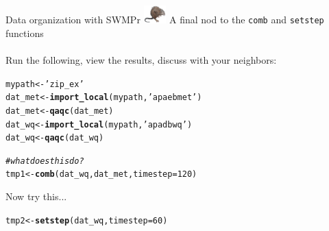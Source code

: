\documentclass[xcolor=dvipsnames]{beamer}\usepackage[]{graphicx}\usepackage[]{color}
\makeatletter
\newcommand{\hlnum}[1]{\textcolor[rgb]{0.686,0.059,0.569}{#1}}%
\newcommand{\hlstr}[1]{\textcolor[rgb]{0.192,0.494,0.8}{#1}}%
\newcommand{\hlcom}[1]{\textcolor[rgb]{0.678,0.584,0.686}{\textit{#1}}}%
\newcommand{\hlstd}[1]{\textcolor[rgb]{0.345,0.345,0.345}{#1}}%
\newcommand{\hlkwb}[1]{\textcolor[rgb]{0.69,0.353,0.396}{#1}}%
\newcommand{\hlkwc}[1]{\textcolor[rgb]{0.333,0.667,0.333}{#1}}%
\newcommand{\hlkwd}[1]{\textcolor[rgb]{0.737,0.353,0.396}{\textbf{#1}}}%
\newenvironment{kframe}{%
 \def\at@end@of@kframe{}%
 \ifinner\ifhmode%
  \def\at@end@of@kframe{\end{minipage}}%
  \begin{minipage}{\columnwidth}%
 \fi\fi%
 \def\FrameCommand##1{\hskip\@totalleftmargin \hskip-\fboxsep
 \colorbox{shadecolor}{##1}\hskip-\fboxsep
     \hskip-\linewidth \hskip-\@totalleftmargin \hskip\columnwidth}%
 \MakeFramed {\advance\hsize-\width
   \@totalleftmargin\z@ \linewidth\hsize
   \@setminipage}}%
 {\par\unskip\endMakeFramed%
 \at@end@of@kframe}
\newenvironment{knitrout}{}{} %
\makeatother
\begin{document}
\begin{frame}[fragile]{Data organization with SWMPr \includegraphics[width = 0.065\textwidth]{imgs/swmprat.png}}
\onslide<+->
A final nod to the \texttt{comb} and \texttt{setstep} functions \\~\\
Run the following, view the results, discuss with your neighbors:
\begin{knitrout}\scriptsize
{}\color{fgcolor}\begin{kframe}
\begin{alltt}
\hlstd{mypath} \hlkwb{<-} \hlstr{'zip_ex'}
\hlstd{dat_met} \hlkwb{<-} \hlkwd{import_local}\hlstd{(mypath,} \hlstr{'apaebmet'}\hlstd{)}
\hlstd{dat_met} \hlkwb{<-} \hlkwd{qaqc}\hlstd{(dat_met)}
\hlstd{dat_wq} \hlkwb{<-} \hlkwd{import_local}\hlstd{(mypath,} \hlstr{'apadbwq'}\hlstd{)}
\hlstd{dat_wq} \hlkwb{<-} \hlkwd{qaqc}\hlstd{(dat_wq)}

\hlcom{# what does this do?}
\hlstd{tmp1} \hlkwb{<-} \hlkwd{comb}\hlstd{(dat_wq, dat_met,} \hlkwc{timestep} \hlstd{=} \hlnum{120}\hlstd{)}
\end{alltt}
\end{kframe}
\end{knitrout}
Now try this...
\begin{knitrout}\scriptsize
{}\color{fgcolor}\begin{kframe}
\begin{alltt}
\hlstd{tmp2} \hlkwb{<-} \hlkwd{setstep}\hlstd{(dat_wq,} \hlkwc{timestep} \hlstd{=} \hlnum{60}\hlstd{)}
\end{alltt}
\end{kframe}
\end{knitrout}
\end{frame}
\end{document}
